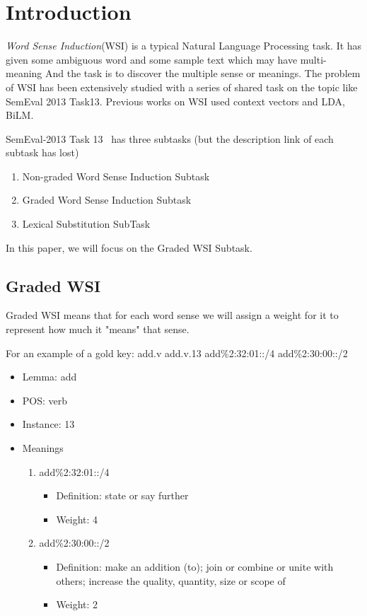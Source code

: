 \section{Introduction}
\label{sec:introduction}

\emph{Word Sense Induction}(WSI) is a typical Natural Language Processing task.
It has given some ambiguous word and some sample text which may have multi-meaning
And the task is to discover the multiple sense or meanings.
The problem of WSI has been extensively studied with a series of shared task on the topic like SemEval 2013 Task13.
Previous works on WSI used context vectors and LDA, BiLM.

SemEval-2013 Task 13~\cite{jurgens2013semeval} has three subtasks (but the description link of each subtask has lost)

\begin{enumerate}
    \item Non-graded Word Sense Induction Subtask
    \item Graded Word Sense Induction Subtask
    \item Lexical Substitution SubTask
\end{enumerate}

In this paper, we will focus on the Graded WSI Subtask.

\subsection*{Graded WSI}

Graded WSI means that for each word sense we will assign a weight for it to represent how much it "means" that sense.

For an example of a gold key: add.v add.v.13 add\%2:32:01::/4 add\%2:30:00::/2

\begin{itemize}
    \item Lemma: add
    \item POS: verb
    \item Instance: 13
    \item Meanings
        \begin{enumerate}
            \item add\%2:32:01::/4
                \begin{itemize}
                    \item Definition: state or say further
                    \item Weight: 4
                \end{itemize}
            \item add\%2:30:00::/2
                \begin{itemize}
                    \item Definition: make an addition (to); join or combine or unite with others; increase the quality, quantity, size or scope of
                    \item Weight: 2
                \end{itemize}
        \end{enumerate}
\end{itemize}

